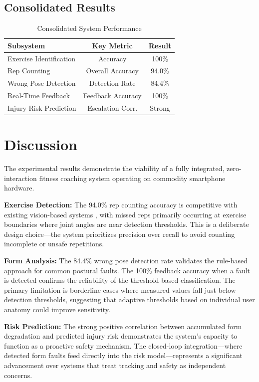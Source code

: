 \documentclass[conference]{IEEEtran}
\begin{document}
\subsection{Consolidated Results}

\begin{table}[htbp]
\caption{Consolidated System Performance}
\begin{center}
\begin{tabular}{|l|c|c|}
\hline
\textbf{Subsystem} & \textbf{Key Metric} & \textbf{Result} \\
\hline
Exercise Identification & Accuracy & 100\% \\
Rep Counting & Overall Accuracy & 94.0\% \\
Wrong Pose Detection & Detection Rate & 84.4\% \\
Real-Time Feedback & Feedback Accuracy & 100\% \\
Injury Risk Prediction & Escalation Corr. & Strong \\
\hline
\end{tabular}
\label{tab:consolidated}
\end{center}
\end{table}

\section{Discussion}

The experimental results demonstrate the viability of a fully integrated, zero-interaction fitness coaching system operating on commodity smartphone hardware.

\textbf{Exercise Detection:} The 94.0\% rep counting accuracy is competitive with existing vision-based systems \cite{b8}, with missed reps primarily occurring at exercise boundaries where joint angles are near detection thresholds. This is a deliberate design choice---the system prioritizes precision over recall to avoid counting incomplete or unsafe repetitions.

\textbf{Form Analysis:} The 84.4\% wrong pose detection rate validates the rule-based approach for common postural faults. The 100\% feedback accuracy when a fault is detected confirms the reliability of the threshold-based classification. The primary limitation is borderline cases where measured values fall just below detection thresholds, suggesting that adaptive thresholds based on individual user anatomy could improve sensitivity.

\textbf{Risk Prediction:} The strong positive correlation between accumulated form degradation and predicted injury risk demonstrates the system's capacity to function as a proactive safety mechanism. The closed-loop integration---where detected form faults feed directly into the risk model---represents a significant advancement over systems that treat tracking and safety as independent concerns.
\end{document}

